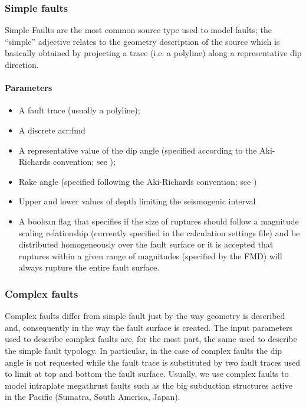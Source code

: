\subsubsection{Simple faults}
%
Simple Faults are the most common source type used to model faults; the 
``simple'' adjective relates to the geometry description of the source 
which is basically obtained by projecting a trace (i.e. a polyline) along 
a representative dip direction. 
%
\paragraph{Parameters}
%
\begin{itemize}
\item A fault trace (usually a polyline); 
\item A discrete \gls{acr:fmd}
\item A representative value of the dip angle (specified according to 
the Aki-Richards convention; see \citet{aki2002});
\item Rake angle (specified following the Aki-Richards convention; 
see \citet{aki2002}) 
\item Upper and lower values of depth limiting the seismogenic interval 
\item A boolean flag that specifies if the size of ruptures should 
follow a magnitude scaling relationship (currently specified in the 
calculation settings file) and be distributed homogeneously over the 
fault surface or it is accepted that ruptures within a given range of 
magnitudes (specified by the FMD) will always rupture the entire fault 
surface.
\end{itemize}
%
\subsubsection{Complex faults}
%
Complex faults  differ from simple fault just by the way geometry is 
described and, consequently in the way the fault surface is created. The 
input parameters used to describe complex faults are, for the most part, 
the same used to describe the simple fault typology. In particular, in 
the case of complex faults the dip angle is not requested while the fault
trace is substituted by two fault traces used to limit at top and bottom 
the fault surface. 
%
Usually, we use complex faults to model intraplate megathrust faults such 
as the big subduction structures active in the Pacific (Sumatra, South 
America, Japan).

